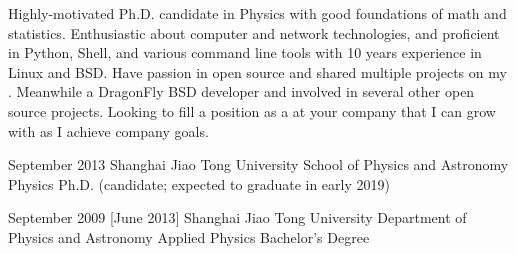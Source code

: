 \documentclass{resume}
\begin{document}
\makeheader

Highly-motivated Ph.D. candidate in Physics with good foundations of
math and statistics.
Enthusiastic about computer and network technologies,
and proficient in Python, Shell, and various command line tools with
10 years experience in Linux and BSD.
Have passion in open source and shared multiple projects on my
.
Meanwhile a DragonFly BSD developer and involved in several other
open source projects.
Looking to fill a position as a \textbf{\getposition}
at your company that I can grow with as I achieve company goals.

\begin{competences}[10em]
\end{competences}

\begin{educations}
  \education%
    {September 2013}%
    {Shanghai Jiao Tong University}%
    {School of Physics and Astronomy}%
    {Physics}%
    {Ph.D. (candidate; expected to graduate in early 2019)}

  \separator{0.5em}
  \education%
    {September 2009}%
    [June 2013]%
    {Shanghai Jiao Tong University}%
    {Department of Physics and Astronomy}%
    {Applied Physics}%
    {Bachelor's Degree}
\end{educations}
\end{document}
